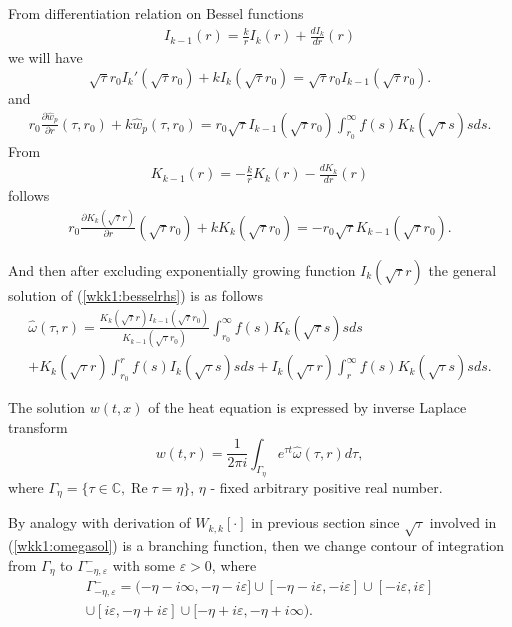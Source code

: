 \documentclass[manuscript, printscheme]{paper}
\newcommand{\CM}{\mathbb{C}}
\begin{document}
From differentiation relation on Bessel functions 
\begin{eqnarray*}
I_{k-1}(r)={\frac {k }{r}}I_{k }(r)+{\frac {dI_{k }}{dr}}(r) 
\end{eqnarray*}
we will have
$$
\sqrt \tau r_0 I_k'(\sqrt \tau r_0) + k I_k(\sqrt{\tau}r_0) = \sqrt \tau r_0 I_{k-1}(\sqrt \tau r_0).
$$
and
\begin{align*}
r_0{\frac{\partial \hat w_p}{\partial r }} (\tau,r_0) + k \hat w_p(\tau,r_0) 
 =  r_0 \sqrt \tau  I_{k-1}(\sqrt \tau r_0) \int_{r_0}^\infty f(s) K_k(\sqrt{\tau}s) s ds.
\end{align*}
From
\begin{align*}
K_{k-1}(r)=-{\frac {k }{r}}K_{k }(r) -{\frac {dK_{k }}{dr}}(r)
\end{align*}
follows
\begin{align*}
r_0{\frac{\partial K_k(\sqrt \tau r)}{\partial r }} (\sqrt \tau r_0) + k K_k(\sqrt \tau r_0) =  -r_0 \sqrt \tau K_{k-1}(\sqrt \tau r_0).
\end{align*}

And then after excluding exponentially growing function $I_k(\sqrt{\tau}r)$ the general solution of (\ref{wkk1:besselrhs}) is as follows
\begin{align} \label{wkk1:omegasol}
 \hat \omega(\tau,r) = \frac{K_{k}(\sqrt{\tau}r) I_{k-1}(\sqrt \tau r_0)}{K_{k-1}(\sqrt \tau r_0)} \int_{r_0}^\infty f(s) K_{k}(\sqrt{\tau}s) s ds\\+ K_{k}(\sqrt{\tau}r)\int_{r_0}^r f(s) I_{k}(\sqrt{\tau}s) s ds  + 
I_{k}(\sqrt{\tau}r)\int_r^{\infty} f(s) K_{k}(\sqrt{\tau}s) s ds.  \nonumber 
\end{align}


The solution $w(t,x)$ of the heat equation is expressed by inverse Laplace transform
$$
w(t,r) = \frac1{2\pi i} \int_{\Gamma_\eta}e^{\tau t}\hat \omega(\tau,r)d\tau,
$$
where $\Gamma_\eta = \{ \tau \in \CM, \operatorname{Re}\tau = \eta \}$, $\eta$ - fixed arbitrary positive real number.

By analogy with derivation of $W_{k,k}[\cdot]$ in previous section since $\sqrt \tau$ involved in (\ref{wkk1:omegasol}) is a branching function, then we change contour of integration from $\Gamma_\eta$ to $\Gamma_{-\eta, \varepsilon}^-$ with some $\varepsilon>0$, where
\begin{eqnarray}
\Gamma_{-\eta, \varepsilon}^- = ( -\eta -i\infty, -\eta -i\varepsilon] \cup
[-\eta - i\varepsilon, - i\varepsilon]     
\cup [- i\varepsilon, i\varepsilon] \nonumber \\
\cup [i\varepsilon, -\eta + i\varepsilon] 
\cup [-\eta + i\varepsilon, -\eta + i\infty). \nonumber
\end{eqnarray}
\end{document}
